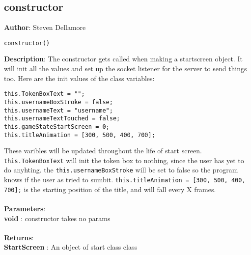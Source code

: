 \documentclass[12pt]{article}
\begin{document}
\subsection{constructor}
\textbf{Author}: Steven Dellamore 
\vspace*{1\baselineskip}
\begin{lstlisting}
constructor()
\end{lstlisting} 
\vspace*{1\baselineskip}
\textbf{Description}: The constructor gets called when making a startscreen object. It will init all the values and set up the socket listener for the server to send things too. Here are the init values of the class variables: 
\begin{verbatim}
this.TokenBoxText = ""; 
this.usernameBoxStroke = false; 
this.usernameText = "username"; 
this.usernameTextTouched = false; 
this.gameStateStartScreen = 0;  
this.titleAnimation = [300, 500, 400, 700];
\end{verbatim}
 These varibles will be updated throughout the life of start screen. \texttt{this.TokenBoxText} will init the token box to nothing, since the user has yet to do anyhting. the \texttt{this.usernameBoxStroke} will be set to false so the program knows if the user as tried to sumbit. \texttt{this.titleAnimation = [300, 500, 400, 700];} is the starting position of the title, and will fall every X frames. \\


\textbf{\large{\\Parameters}}:\\
\textbf{void }: constructor takes no params\\\textbf{\large{\\Returns}}:\\\textbf{StartScreen }: An object of start class class
\end{document}
